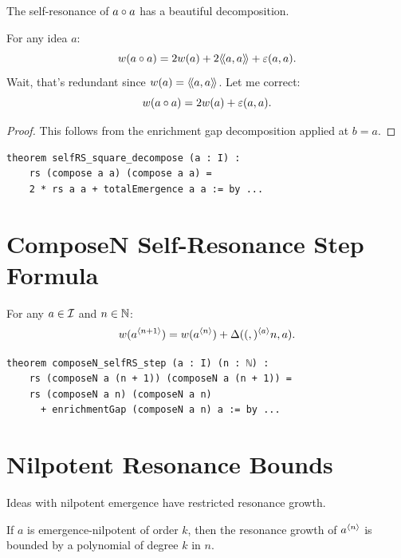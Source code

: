 The self-resonance of $a \circ a$ has a beautiful decomposition.

\begin{theorem}
\label{thm:selfRS-square-decompose}
For any idea $a$:
\[
  w(a \circ a) = 2w(a) + 2\langle\!\langle a, a \rangle\!\rangle + \varepsilon(a,a).
\]
Wait, that's redundant since $w(a) = \langle\!\langle a, a \rangle\!\rangle$. Let me correct:
\[
  w(a \circ a) = 2w(a) + \varepsilon(a,a).
\]
\end{theorem}

\begin{proof}
This follows from the enrichment gap decomposition applied at $b = a$.
\end{proof}

\begin{lstlisting}[caption={Square decomposition (IDT\_v3\_Emergence.lean)}]
theorem selfRS_square_decompose (a : I) :
    rs (compose a a) (compose a a) =
    2 * rs a a + totalEmergence a a := by ...
\end{lstlisting}


\section{ComposeN Self-Resonance Step Formula}

\begin{theorem}
\label{thm:composeN-selfRS-step}
For any $a \in \mathcal{I}$ and $n \in \mathbb{N}$:
\[
  w(a^{\langle n+1 \rangle}) = w(a^{\langle n \rangle}) + \Delta((,)^{\langle a \rangle}{n}, a).
\]
\end{theorem}

\begin{lstlisting}[caption={ComposeN self-resonance step (IDT\_v3\_Emergence.lean)}]
theorem composeN_selfRS_step (a : I) (n : ℕ) :
    rs (composeN a (n + 1)) (composeN a (n + 1)) =
    rs (composeN a n) (composeN a n)
      + enrichmentGap (composeN a n) a := by ...
\end{lstlisting}


\section{Nilpotent Resonance Bounds}

Ideas with nilpotent emergence have restricted resonance growth.

\begin{theorem}
\label{thm:nilpotentK-resonance}
If $a$ is emergence-nilpotent of order $k$, then the resonance growth of
$a^{\langle n \rangle}$ is bounded by a polynomial of degree $k$ in $n$.
\end{theorem}

